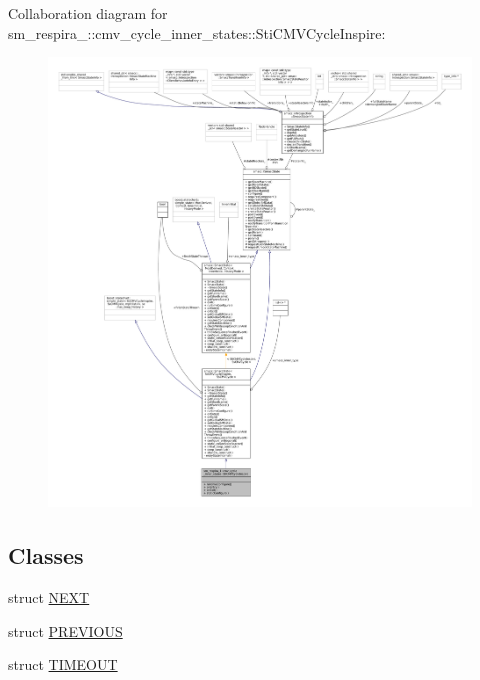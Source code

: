 Collaboration diagram for sm\+\_\+respira\+\_\+:\+:cmv\+\_\+cycle\+\_\+inner\+\_\+states\+:\+:Sti\+C\+M\+V\+Cycle\+Inspire\+:
\nopagebreak
\begin{figure}[H]
\begin{center}
\leavevmode
\includegraphics[width=350pt]{structsm__respira__1_1_1cmv__cycle__inner__states_1_1StiCMVCycleInspire__coll__graph}
\end{center}
\end{figure}
\subsection*{Classes}
\begin{DoxyCompactItemize}
\item 
struct \hyperlink{structsm__respira__1_1_1cmv__cycle__inner__states_1_1StiCMVCycleInspire_1_1NEXT}{N\+E\+XT}
\item 
struct \hyperlink{structsm__respira__1_1_1cmv__cycle__inner__states_1_1StiCMVCycleInspire_1_1PREVIOUS}{P\+R\+E\+V\+I\+O\+US}
\item 
struct \hyperlink{structsm__respira__1_1_1cmv__cycle__inner__states_1_1StiCMVCycleInspire_1_1TIMEOUT}{T\+I\+M\+E\+O\+UT}
\end{DoxyCompactItemize}
